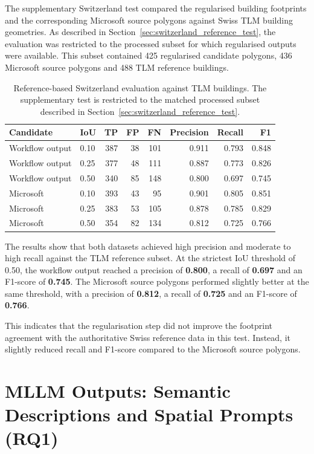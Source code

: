 The supplementary Switzerland test compared the regularised building footprints and the corresponding Microsoft source polygons against Swiss TLM building geometries. As described in Section~\ref{sec:switzerland_reference_test}, the evaluation was restricted to the processed subset for which regularised outputs were available. This subset contained 425 regularised candidate polygons, 436 Microsoft source polygons and 488 TLM reference buildings.

\begin{table}[htp]
\centering
\caption{Reference-based Switzerland evaluation against TLM buildings. The supplementary test is restricted to the matched processed subset described in Section~\ref{sec:switzerland_reference_test}.}
\label{tab:switzerland_reference_evaluation}
\begin{tabular}{llrrrrrr}
\toprule
{Candidate} & {IoU} & {TP} & {FP} & {FN} & {Precision} & {Recall} & {F1} \\
\midrule
Workflow output & 0.10 & 387 & 38 & 101 & 0.911 & 0.793 & 0.848 \\
Workflow output & 0.25 & 377 & 48 & 111 & 0.887 & 0.773 & 0.826 \\
Workflow output & 0.50 & 340 & 85 & 148 & 0.800 & 0.697 & 0.745 \\
Microsoft   & 0.10 & 393 & 43 & 95  & 0.901 & 0.805 & 0.851 \\
Microsoft   & 0.25 & 383 & 53 & 105 & 0.878 & 0.785 & 0.829 \\
Microsoft   & 0.50 & 354 & 82 & 134 & 0.812 & 0.725 & 0.766 \\
\bottomrule
\end{tabular}
\end{table}

The results show that both datasets achieved high precision and moderate to high recall against the TLM reference subset. At the strictest IoU threshold of 0.50, the workflow output reached a precision of \textbf{0.800}, a recall of \textbf{0.697} and an F1-score of \textbf{0.745}. The Microsoft source polygons performed slightly better at the same threshold, with a precision of \textbf{0.812}, a recall of \textbf{0.725} and an F1-score of \textbf{0.766}.

This indicates that the regularisation step did not improve the footprint agreement with the authoritative Swiss reference data in this test. Instead, it slightly reduced recall and F1-score compared to the Microsoft source polygons.

\section{MLLM Outputs: Semantic Descriptions and Spatial Prompts (RQ1)}
\label{sec:results_mllm_outputs}

